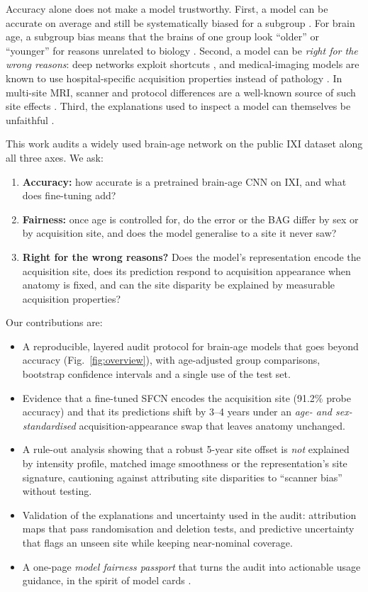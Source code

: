 \documentclass[conference]{IEEEtran}
\begin{document}
Accuracy alone does not make a model trustworthy. First, a model can be accurate on average and still be systematically biased for a subgroup \cite{larrazabal2020gender,seyyed2021underdiagnosis,riccilara2022fairness}. For brain age, a subgroup bias means that the brains of one group look ``older'' or ``younger'' for reasons unrelated to biology \cite{picarra2023brainage}. Second, a model can be \emph{right for the wrong reasons}: deep networks exploit shortcuts \cite{geirhos2020shortcut}, and medical-imaging models are known to use hospital-specific acquisition properties instead of pathology \cite{zech2018pneumonia,degrave2021covid}. In multi-site MRI, scanner and protocol differences are a well-known source of such site effects \cite{glocker2019scanner,fortin2018harmonization,dinsdale2021unlearning}. Third, the explanations used to inspect a model can themselves be unfaithful \cite{adebayo2018sanity,hooker2019benchmark}.

This work audits a widely used brain-age network on the public IXI dataset along all three axes. We ask:
\begin{enumerate}
\item \textbf{Accuracy:} how accurate is a pretrained brain-age CNN on IXI, and what does fine-tuning add?
\item \textbf{Fairness:} once age is controlled for, do the error or the BAG differ by sex or by acquisition site, and does the model generalise to a site it never saw?
\item \textbf{Right for the wrong reasons?} Does the model's representation encode the acquisition site, does its prediction respond to acquisition appearance when anatomy is fixed, and can the site disparity be explained by measurable acquisition properties?
\end{enumerate}

Our contributions are:
\begin{itemize}
\item A reproducible, layered audit protocol for brain-age models that goes beyond accuracy (Fig.~\ref{fig:overview}), with age-adjusted group comparisons, bootstrap confidence intervals and a single use of the test set.
\item Evidence that a fine-tuned SFCN encodes the acquisition site (91.2\% probe accuracy) and that its predictions shift by 3--4 years under an \emph{age- and sex-standardised} acquisition-appearance swap that leaves anatomy unchanged.
\item A rule-out analysis showing that a robust 5-year site offset is \emph{not} explained by intensity profile, matched image smoothness or the representation's site signature, cautioning against attributing site disparities to ``scanner bias'' without testing.
\item Validation of the explanations and uncertainty used in the audit: attribution maps that pass randomisation and deletion tests, and predictive uncertainty that flags an unseen site while keeping near-nominal coverage.
\item A one-page \emph{model fairness passport} that turns the audit into actionable usage guidance, in the spirit of model cards \cite{mitchell2019modelcards}.
\end{itemize}
\end{document}
